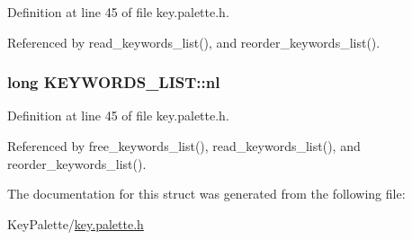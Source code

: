 Definition at line 45 of file key.\-palette.\-h.



Referenced by read\-\_\-keywords\-\_\-list(), and reorder\-\_\-keywords\-\_\-list().

\hypertarget{struct_k_e_y_w_o_r_d_s___l_i_s_t_a86f06811b371ffb07521e5270f359dbf}{
\subsubsection[{nl}]{\setlength{\rightskip}{0pt plus 5cm}long K\-E\-Y\-W\-O\-R\-D\-S\-\_\-\-L\-I\-S\-T\-::nl}}\label{struct_k_e_y_w_o_r_d_s___l_i_s_t_a86f06811b371ffb07521e5270f359dbf}


Definition at line 45 of file key.\-palette.\-h.



Referenced by free\-\_\-keywords\-\_\-list(), read\-\_\-keywords\-\_\-list(), and reorder\-\_\-keywords\-\_\-list().



The documentation for this struct was generated from the following file\-:\begin{DoxyCompactItemize}
\item 
Key\-Palette/\hyperlink{key_8palette_8h}{key.\-palette.\-h}\end{DoxyCompactItemize}
